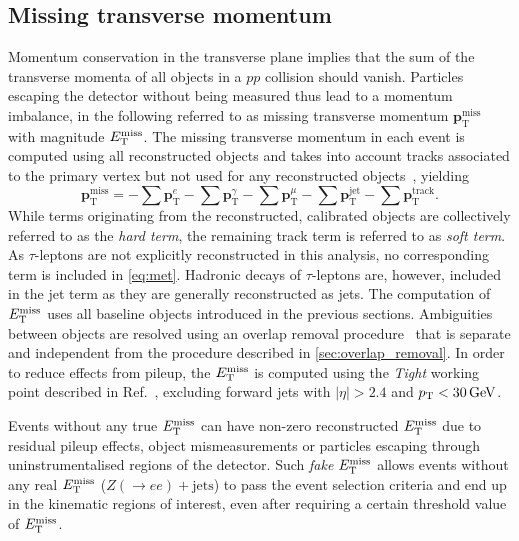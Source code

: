 \subsection{Missing transverse momentum}

Momentum conservation in the transverse plane implies that the sum of the transverse momenta of all objects in a $pp$ collision should vanish. Particles escaping the detector without being measured thus lead to a momentum imbalance, in the following referred to as missing transverse momentum $\boldsymbol{p}^{\textrm{miss}}_\textrm{T}$ with magnitude $E_{\textrm{T}}^{\textrm{miss}}$. The missing transverse momentum in each event is computed using all reconstructed objects and takes into account tracks associated to the primary vertex but not used for any reconstructed objects~\cite{PERF-2016-07}, yielding
\begin{equation}
	\boldsymbol{p}^{\textrm{miss}}_\textrm{T} = - \sum\boldsymbol{p}^{e}_{\textrm{T}} - \sum\boldsymbol{p}^{\gamma}_{\textrm{T}} - \sum\boldsymbol{p}^{\mu}_{\textrm{T}} - \sum\boldsymbol{p}^{\mathrm{jet}}_{\textrm{T}} - \sum\boldsymbol{p}^{\mathrm{track}}_{\textrm{T}}.
	\label{eq:met}
\end{equation}
While terms originating from the reconstructed, calibrated objects are collectively referred to as the \textit{hard term}, the remaining track term is referred to as \textit{soft term}. As $\tau$-leptons are not explicitly reconstructed in this analysis, no corresponding term is included in \cref{eq:met}. Hadronic decays of $\tau$-leptons are, however, included in the jet term as they are generally reconstructed as jets. The computation of $E_{\textrm{T}}^{\textrm{miss}}$ uses all baseline objects introduced in the previous sections. Ambiguities between objects are resolved using an overlap removal procedure~\cite{PERF-2016-07} that is separate and independent from the procedure described in \cref{sec:overlap_removal}. In order to reduce effects from pileup, the $E_{\textrm{T}}^{\textrm{miss}}$ is computed using the \textit{Tight} working point described in Ref.~\cite{ATLAS-CONF-2018-023}, excluding forward jets with $\vert\eta\vert > 2.4$ and $\pt < \SI{30}{\GeV}$.

Events without any true $E_{\textrm{T}}^{\textrm{miss}}$ can have non-zero reconstructed $E_{\textrm{T}}^{\textrm{miss}}$ due to residual pileup effects, object mismeasurements or particles escaping through uninstrumentalised regions of the detector. Such \textit{fake} $E_{\textrm{T}}^{\textrm{miss}}$ allows events without any real $E_{\textrm{T}}^{\textrm{miss}}$ (\eg $Z(\rightarrow ee)+\mathrm{jets}$) to pass the event selection criteria and end up in the kinematic regions of interest, even after requiring a certain threshold value of $E_{\textrm{T}}^{\textrm{miss}}$.


